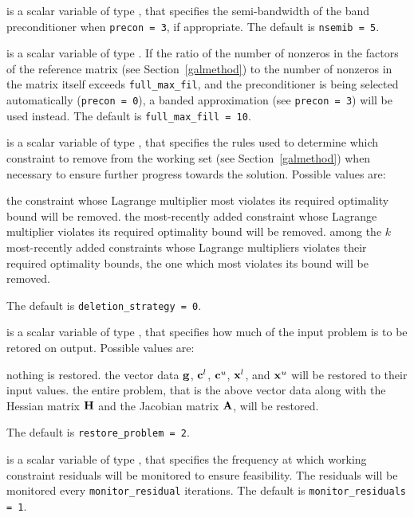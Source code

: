 \begin{description}
 is a scalar variable of type \integer, that specifies
the semi-bandwidth of the band preconditioner when {\tt precon = 3},
if appropriate.
The default is {\tt nsemib = 5}.

 is a scalar variable of type \integer.
If the ratio of the number of nonzeros in the factors
of the reference matrix (see Section~\ref{galmethod}) to the number of
nonzeros in the matrix itself exceeds {\tt full\_max\_fil},
and the preconditioner is being selected
automatically ({\tt precon = 0}), a banded approximation (see {\tt precon = 3})
will be used instead.
The default is {\tt full\_max\_fill = 10}.

 is a scalar variable of type \integer, that
specifies the rules used to determine which constraint to remove
from the working set (see Section~\ref{galmethod}) when necessary to ensure
further progress towards the solution. Possible values are:
\begin{description}
 the constraint whose Lagrange multiplier most violates its
required optimality bound will be removed.
the most-recently added constraint whose Lagrange multiplier violates its
required optimality bound will be removed.
 among the $k$ most-recently added constraints whose
Lagrange multipliers violates their required optimality bounds,
the one which most violates its bound will be removed.
\end{description}
The default is {\tt deletion\_strategy = 0}.

 is a scalar variable of type \integer, that
specifies how much of the input problem is to be retored on output.
Possible values are:
\begin{description}
 nothing is restored.
 the vector data ${\mathbf{g}}$,
   ${\mathbf{c}}^{l}$, ${\mathbf{c}}^{u}$, ${\mathbf{x}}^{l}$, and ${\mathbf{x}}^{u}$
   will be restored to their input values.
 the entire problem, that is the above vector data along with
the Hessian matrix ${\mathbf{H}}$ and the Jacobian matrix ${\mathbf{A}}$, will be restored.
\end{description}
The default is {\tt restore\_problem = 2}.

 is a scalar variable of type \integer, that
specifies the frequency at which working constraint residuals will be monitored
to ensure feasibility. The  residuals will be monitored every
{\tt monitor\_residu\-al} iterations.
The default is {\tt monitor\_residuals = 1}.


\end{description}
